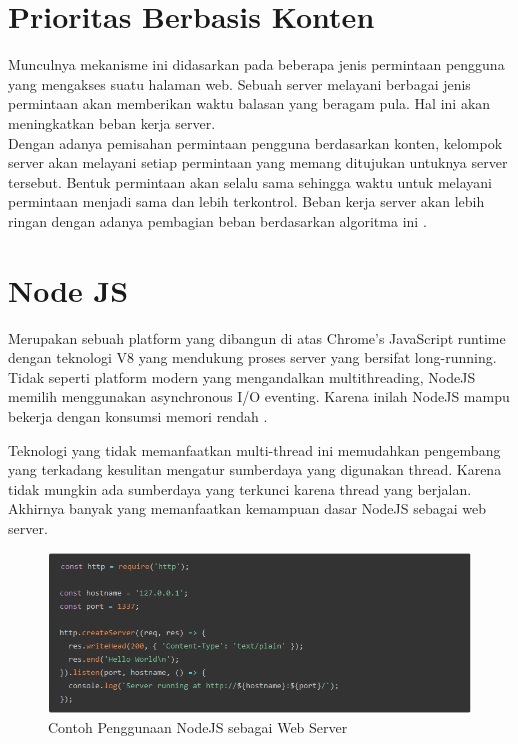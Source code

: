 \documentclass{ta-its}
\begin{document}
        \section{Prioritas Berbasis Konten}
			Munculnya mekanisme ini didasarkan pada beberapa jenis permintaan pengguna yang mengakses suatu halaman web. Sebuah server melayani berbagai jenis permintaan akan memberikan waktu balasan yang beragam pula. Hal ini akan meningkatkan beban kerja server. \\
			\indent Dengan adanya pemisahan permintaan pengguna berdasarkan konten, kelompok server akan melayani setiap permintaan yang memang ditujukan untuknya server tersebut. Bentuk permintaan akan selalu sama sehingga waktu untuk melayani permintaan menjadi sama dan lebih terkontrol. Beban kerja server akan lebih ringan dengan adanya pembagian beban berdasarkan algoritma ini \cite{paperAlgoritma}.

        \section{Node JS}
			Merupakan sebuah platform yang dibangun di atas Chrome's JavaScript runtime dengan teknologi V8 yang mendukung proses server yang bersifat long-running. Tidak seperti platform modern yang mengandalkan multithreading, NodeJS memilih menggunakan asynchronous I/O eventing. Karena inilah NodeJS mampu bekerja dengan konsumsi memori rendah \cite{webNodeJS}\cite{useNodeJS}.
			
			Teknologi yang tidak memanfaatkan multi-thread ini memudahkan pengembang yang terkadang kesulitan mengatur sumberdaya yang digunakan thread. Karena tidak mungkin ada sumberdaya yang terkunci karena thread yang berjalan. Akhirnya banyak yang memanfaatkan kemampuan dasar NodeJS sebagai web server.
			
			\begin{figure}[h] %
				\centering
				\includegraphics[width=\linewidth]{contoh_img/contoh_nodejs}
				\caption{Contoh Penggunaan NodeJS sebagai Web Server}
				\label{contohNodeJS}
			\end{figure}
			
\end{document}
